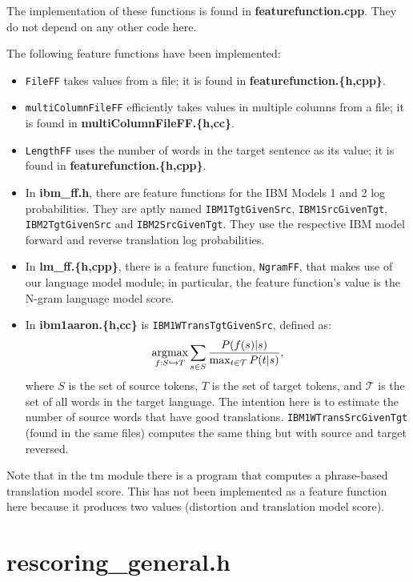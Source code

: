 \documentclass[12pt]{amsart}
\newcommand{\argmax}{\mathop{\rm argmax}}
\newcommand{\file}{\textbf} \newcommand{\url}{\underline}
\newcommand{\code}[1]{{\small \texttt{#1}}}
\begin{document}
The implementation of these functions is found in \file{featurefunction.cpp}.
They do not depend on any other code here.

The following feature functions have been implemented:
\begin{itemize}
\item \code{FileFF} takes values from a file; it is found in
      \file{featurefunction.\{h,cpp\}}.
\item \code{multiColumnFileFF} efficiently takes values in multiple columns
      from a file; it is found in \file{multiColumnFileFF.\{h,cc\}}.
\item \code{LengthFF} uses the number of words in the target sentence as its
      value; it is found in \file{featurefunction.\{h,cpp\}}.
\item In \file{ibm\_ff.h}, there are feature functions for the IBM Models 1 and
      2 log probabilities.  They are aptly named \code{IBM1TgtGivenSrc},
      \code{IBM1SrcGivenTgt}, \code{IBM2TgtGivenSrc} and
      \code{IBM2SrcGivenTgt}.  They use the respective IBM model forward and
      reverse translation log probabilities.
\item In \file{lm\_ff.\{h,cpp\}}, there is a feature function,
      \code{NgramFF}, that makes use of our language model module; in
      particular, the feature function's value is the N-gram language model
      score.
\item In \file{ibm1aaron.\{h,cc\}} is \code{IBM1WTransTgtGivenSrc}, defined as:
  \[ \argmax_{f:S \hookrightarrow T} \sum_{s \in S} \frac{P(f(s)|s)}{\max_{t
  \in \mathcal{T}} P(t|s)}, \] where $S$ is the set of source tokens, $T$ is
  the set of target tokens, and $\mathcal{T}$ is the set of all words in the
  target language.  The intention here is to estimate the number of source
  words that have good translations.  \code{IBM1WTransSrcGivenTgt} (found in
  the same files) computes the same thing but with source and target reversed.
\end{itemize}

Note that in the tm module there is a program that computes a phrase-based
translation model score.  This has not been implemented as a feature function
here because it produces two values (distortion and translation model score).

\section*{\file{rescoring\_general.h}}
\end{document}

